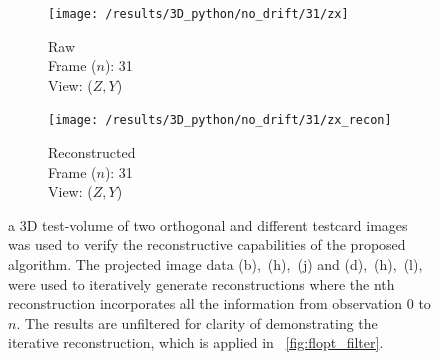 \begin{figure}
\begin{subfigure}[t]{0.2\linewidth}
    \end{subfigure}\hfill
    \begin{subfigure}[t]{0.2\linewidth}
        \centering
        \texttt{[image: /results/3D\_python/no\_drift/31/zx]}\caption{Raw\\Frame (\(n\)): 31\\View: (\(Z,Y\))}
    \end{subfigure}\hfill
    \begin{subfigure}[t]{0.2\linewidth}
        \centering
        \texttt{[image: /results/3D\_python/no\_drift/31/zx\_recon]}\caption{Reconstructed\\Frame (\(n\)): 31\\View: (\(Z,Y\))}
    \end{subfigure}
    \caption{a \gls{3D} test-volume of two orthogonal and different testcard images was used to verify the reconstructive capabilities of the proposed algorithm.
    The projected image data (b),~(h),~(j) and (d),~(h),~(l), were used to iteratively generate reconstructions where the nth reconstruction incorporates all the information from observation 0 to \(n\).
    The results are unfiltered for clarity of demonstrating the iterative reconstruction, which is applied in \figurename~\ref{fig:flopt_filter}.
    }\label{fig:recon_iterative}
\end{figure}

